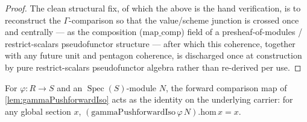 \begin{proof}
  The clean structural fix, of which the above is the hand verification, is to reconstruct
  the \(\Gamma\)-comparison so that the value/scheme junction is crossed once and centrally
  — as the composition (\(\mathrm{map\_comp}\)) field of a presheaf-of-modules /
  restrict-scalars pseudofunctor structure — after which this coherence, together with any
  future unit and pentagon coherence, is discharged once at construction by pure
  restrict-scalars pseudofunctor algebra rather than re-derived per use.
\end{proof}

\begin{lemma}


  \label{lem:gammaPushforwardIso_hom_apply}
  For \(\varphi : R \to S\) and an \(\operatorname{Spec}(S)\)-module \(N\), the forward
  comparison map of \cref{lem:gammaPushforwardIso} acts as the identity on the underlying
  carrier: for any global section \(x\), \((\mathrm{gammaPushforwardIso}\,\varphi\,N).\mathrm{hom}\,x = x\).
\end{lemma}

